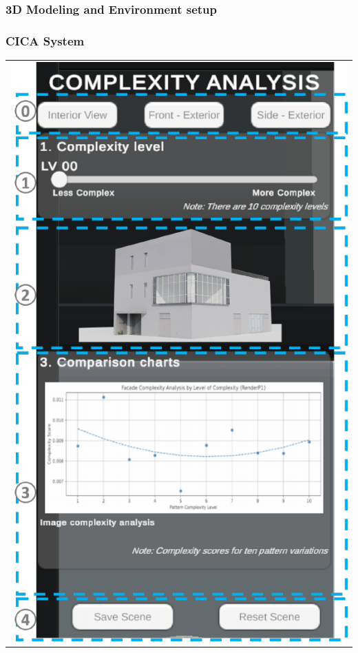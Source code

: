 \begin{linenumbers}
    \subsubsection{3D Modeling and Environment setup}
    \label{subsubsec:3DModeling}
    


    \subsubsection{CICA System}
    \label{subsubsec:CICAsystem}
    

    \begin{table}[htb]
        \centering
        \small
        \begin{tabular}{c}
            \begin{minipage}{\textwidth}
                \centering
                  \includegraphics[width= \linewidth]{Images/VRInterface}

\end{minipage}
\end{tabular}
\end{table}
\end{linenumbers}
